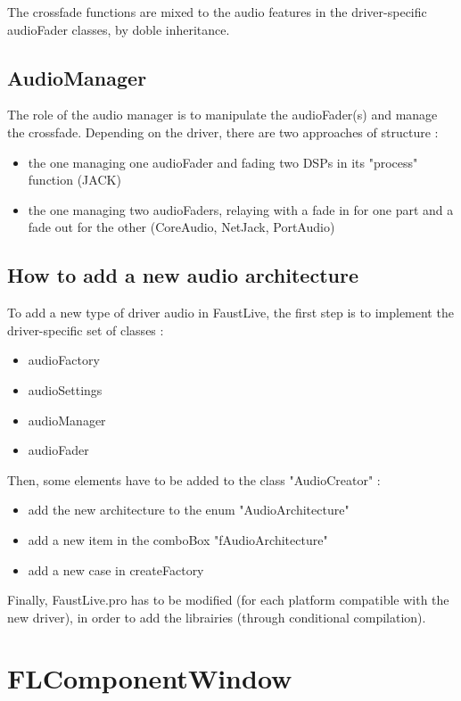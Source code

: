 \documentclass[a4paper]{article}
\begin{document}
{The crossfade functions are mixed to the audio features in the driver-specific audioFader classes, by doble inheritance.

\subsection{AudioManager}

The role of the audio manager is to manipulate the audioFader(s) and manage the crossfade. Depending on the driver, there are two approaches of structure :
\begin{itemize}
\item the one managing one audioFader and fading two DSPs in its "process" function (JACK)
\item the one managing two audioFaders, relaying with a fade in for one part and a fade out for the other (CoreAudio, NetJack, PortAudio)
\end{itemize}

\subsection{How to add a new audio architecture}

To add a new type of driver audio in FaustLive, the first step is to implement the driver-specific set of classes :
\begin{itemize}
\item audioFactory
\item audioSettings
\item audioManager
\item audioFader
\end{itemize}

Then, some elements have to be added to the class "AudioCreator" : 
\begin{itemize}
\item add the new architecture to the enum "AudioArchitecture"
\item add a new item in the comboBox "fAudioArchitecture"
\item add a new case in createFactory
\end{itemize}

Finally, FaustLive.pro has to be modified (for each platform compatible with the new driver), in order to add the librairies (through conditional compilation).

\section{FLComponentWindow}

}
\end{document}
